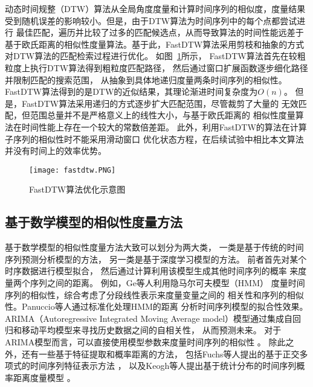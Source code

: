 动态时间规整（DTW）算法从全局角度度量和计算时间序列的相似度，度量结果
受到随机误差的影响较小。但是，由于DTW算法为时间序列中的每个点都尝试进行
最佳匹配，遍历并比较了过多的匹配候选点，从而导致算法的时间性能远差于
基于欧氏距离的相似性度量算法。基于此，FastDTW算法采用剪枝和抽象的方式
对DTW算法的匹配检索过程进行优化\cite{DBLP:journals/ida/SalvadorC07}。
如图~\ref{fig:fastdtw}所示，
FastDTW算法首先在较粗粒度上执行DTW算法得到粗粒度匹配路径，
然后通过窗口扩展函数逐步细化路径并限制匹配的搜索范围，
从抽象到具体地递归度量两条时间序列的相似性。
FastDTW算法得到的是DTW的近似结果，其理论渐进时间复杂度为$O(n)$。
但是，FastDTW算法采用递归的方式逐步扩大匹配范围，尽管裁剪了大量的
无效匹配，但范围总量并不是严格意义上的线性大小，与基于欧氏距离的
相似性度量算法在时间性能上存在一个较大的常数倍差距。
此外，利用FastDTW的算法在计算子序列的相似性时不能采用滑动窗口
优化状态方程，在后续试验中相比本文算法并没有时间上的效率优势。

\begin{figure}
  \centering
  \texttt{[image: fastdtw.PNG]}
  \caption{FastDTW算法优化示意图}
  \label{fig:fastdtw}
\end{figure}

\subsection{基于数学模型的相似性度量方法}
基于数学模型的相似性度量方法大致可以划分为两大类，
一类是基于传统的时间序列预测分析模型的方法，
另一类是基于深度学习模型的方法。
前者首先对某个时序数据进行模型拟合，
然后通过计算利用该模型生成其他时间序列的概率
来度量两个序列之间的距离。
例如，Ge等人利用隐马尔可夫模型（HMM）\cite{DBLP:conf/kdd/GeS00}
度量时间序列的相似性，综合考虑了分段线性表示来度量变量之间的
相关性和序列的相似性。Panuccio等人通过标准化处理HMM的距离
分析时间序列模型的拟合性效果\cite{DBLP:conf/sspr/PanuccioBM02}。
ARIMA（Autoregressive Integrated Moving Average model）模型通过集成自回归和移动平均模型来寻找历史数据之间的自相关性，
从而预测未来\cite{DBLP:conf/aaai/LiuHZS16}。
对于ARIMA模型而言，可以直接使用模型参数来度量时间序列的相似性
\cite{DBLP:conf/icdm/KalpakisGP01}。
除此之外，还有一些基于特征提取和概率距离的方法，
包括Fuchs等人提出的基于正交多项式的时间序列特征表示方法
\cite{DBLP:journals/ijon/FuchsGPS10}，
以及Keogh等人提出基于统计分布的时间序列概率距离度量模型
\cite{DBLP:conf/kdd/KeoghS97}。

